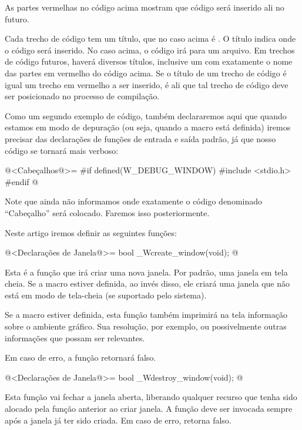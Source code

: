 As partes vermelhas no código acima mostram que código será inserido
ali no futuro.

Cada trecho de código tem um título, que no caso acima
é . O título indica onde o código será
inserido. No caso acima, o código irá para um arquivo. Em trechos de
código futuros, haverá diversos títulos, inclusive um com exatamente o
nome das partes em vermelho do código acima. Se o título de um trecho
de código é igual um trecho em vermelho a ser inserido, é ali que tal
trecho de código deve ser posicionado no processo de compilação.

Como um segundo exemplo de código, também declararemos aqui que quando
estamos em modo de depuração (ou seja, quando a
macro  está definida) iremos precisar das
declarações de funções de entrada e saída padrão, já que nosso código
se tornará mais verboso:

\iniciocodigo
@<Cabeçalhos@>=
#if defined(W_DEBUG_WINDOW)
#include <stdio.h>
#endif
@
\fimcodigo

Note que ainda não informamos onde exatamente o código denominado
``Cabeçalho'' será colocado. Faremos isso posteriormente.


Neste artigo iremos definir as seguintes funções:

\iniciocodigo
@<Declarações de Janela@>=
bool _Wcreate_window(void);
@
\fimcodigo

Esta é a função que irá criar uma nova janela. Por padrão, uma janela
em tela cheia. Se a macro 
estiver definida, ao invés disso, ele criará uma janela que não está
em modo de tela-cheia (se suportado pelo sistema).

Se a macro  estiver definida, esta função
também imprimirá na tela informação sobre o ambiente gráfico. Sua
resolução, por exemplo, ou possivelmente outras informações que possam
ser relevantes.

Em caso de erro, a função retornará falso.

\iniciocodigo
@<Declarações de Janela@>=
bool _Wdestroy_window(void);
@
\fimcodigo

Esta função vai fechar a janela aberta, liberando qualquer recurso que
tenha sido alocado pela função anterior ao criar janela. A função deve
ser invocada sempre após a janela já ter sido criada. Em caso de erro,
retorna falso.


